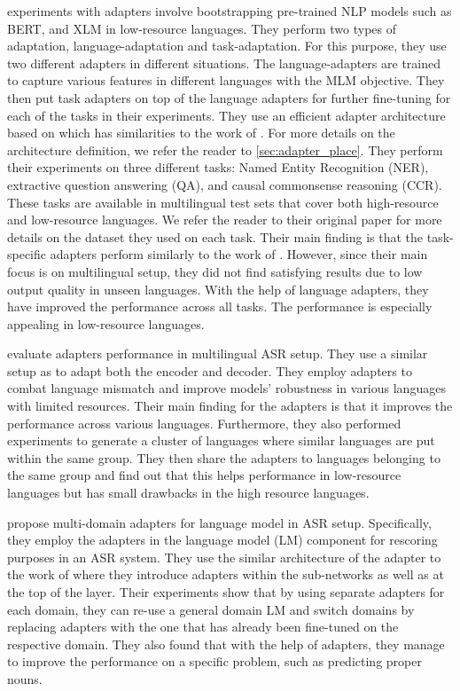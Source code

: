  experiments with adapters involve bootstrapping pre-trained NLP models such as BERT, and XLM  in low-resource languages. They perform two types of adaptation, language-adaptation and task-adaptation. For this purpose, they use two different adapters in different situations. The language-adapters are trained to capture various features in different languages with the MLM objective. They then put task adapters on top of the language adapters for further fine-tuning for each of the tasks in their experiments. They use an efficient adapter architecture based on  which has similarities to the work of . For more details on the architecture definition, we refer the reader to \cref{sec:adapter_place}. They perform their experiments on three different tasks: Named Entity Recognition (NER), extractive question answering (QA), and causal commonsense reasoning (CCR). These tasks are available in multilingual test sets that cover both high-resource and low-resource languages. We refer the reader to their original paper for more details on the dataset they used on each task. Their main finding is that the task-specific adapters perform similarly to the work of . However, since their main focus is on multilingual setup, they did not find satisfying results due to low output quality in unseen languages. With the help of language adapters, they have improved the performance across all tasks. The performance is especially appealing in low-resource languages.

 evaluate adapters performance in multilingual ASR setup. They use a similar setup as  to adapt both the encoder and decoder. They employ adapters to combat language mismatch and improve models' robustness in various languages with limited resources. Their main finding for the adapters is that it improves the performance across various languages. Furthermore, they also performed experiments to generate a cluster of languages where similar languages are put within the same group. They then share the adapters to languages belonging to the same group and find out that this helps performance in low-resource languages but has small drawbacks in the high resource languages.

 propose multi-domain adapters for language model in ASR setup. Specifically, they employ the adapters in the language model (LM) component for rescoring purposes in an ASR system. They use the similar architecture of the adapter to the work of  where they introduce adapters within the sub-networks as well as at the top of the layer. Their experiments show that by using separate adapters for each domain, they can re-use a general domain LM and switch domains by replacing adapters with the one that has already been fine-tuned on the respective domain. They also found that with the help of adapters, they manage to improve the performance on a specific problem, such as predicting proper nouns.


